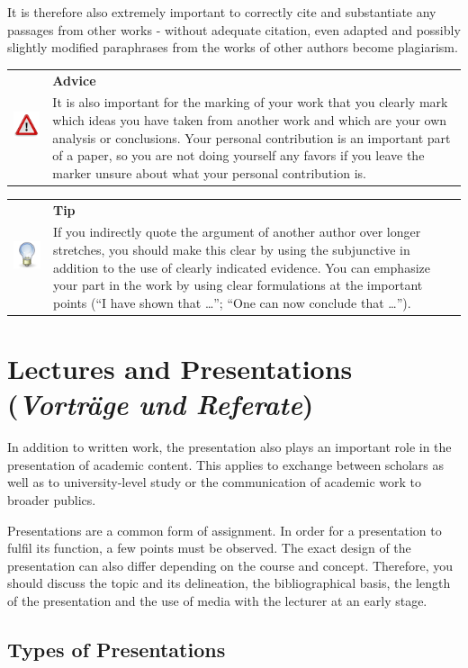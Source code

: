 \documentclass[
  english,
]{scrreprt}
\newlength{\iconwidth}
\newenvironment{displaybox}[2]{%
    \begin{center}
        \setlength\arrayrulewidth{0.75pt}%
        \arrayrulecolor{white}%
        \renewcommand{\arraystretch}{1.3}%
        \begin{tabular}{p{\iconwidth}p{\linewidth-4\tabcolsep-\iconwidth}}
            \multirow{2}{*}{#2}&\cellcolor{boxheadcol}\textbf{\sffamily\color{white}#1} \\%
            \hhline{~-}%
            &\cellcolor{boxcol}%
}{%
            \\
        \end{tabular}
        \arrayrulecolor{black}
    \end{center}
}
\newenvironment{Tip}{%
\begin{displaybox}{Tip}{\includegraphics[width=\iconwidth]{images/icon-tipp}}}%
{\end{displaybox}}
\newenvironment{Advice}{%
\begin{displaybox}{Advice}{\includegraphics[width=\iconwidth]{images/icon-hinweis}}}%
{\end{displaybox}}
\begin{document}
It is therefore also extremely important to correctly cite and substantiate any passages from other works - without adequate citation, even adapted and possibly slightly modified paraphrases from the works of other authors become plagiarism.

\begin{Advice}

It is also important for the marking of your work that you clearly mark which ideas you have taken from another work and which are your own analysis or conclusions. Your personal contribution is an important part of a paper, so you are not doing yourself any favors if you leave the marker unsure about what your personal contribution is.

\end{Advice}

\begin{Tip}

If you indirectly quote the argument of another author over longer stretches, you should make this clear by using the subjunctive in addition to the use of clearly indicated evidence. You can emphasize your part in the work by using clear formulations at the important points (“I have shown that …”; “One can now conclude that …”).

\end{Tip}

\chapter{\texorpdfstring{Lectures and Presentations (\emph{Vorträge und Referate})}{Lectures and Presentations (Vorträge und Referate)}}\label{sec:presentations}

In addition to written work, the presentation also plays an important role in the presentation of academic content. This applies to exchange between scholars as well as to university-level study or the communication of academic work to broader publics.

Presentations are a common form of assignment. In order for a presentation to fulfil its function, a few points must be observed. The exact design of the presentation can also differ depending on the course and concept. Therefore, you should discuss the topic and its delineation, the bibliographical basis, the length of the presentation and the use of media with the lecturer at an early stage.

\section{Types of Presentations}\label{types-of-presentations}
\end{document}
